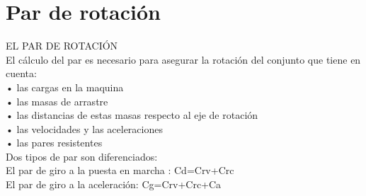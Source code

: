 \documentclass[12pt,a4paper]{article}
\begin{document}
\section{Par de rotación}
EL PAR DE ROTACIÓN\\
El cálculo del par es necesario para asegurar la rotación del conjunto que tiene en cuenta:\\
   • las cargas en la maquina\\
   • las masas de arrastre\\
   • las distancias de estas masas respecto al eje de rotación\\
   • las velocidades y las aceleraciones\\
   • las pares resistentes\\

Dos tipos de par son diferenciados:\\
   El par de giro a la puesta en marcha : Cd=Crv+Crc\\
   El par de giro a la aceleración: Cg=Crv+Crc+Ca\\
\end{document}
